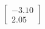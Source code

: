 \documentclass[preview]{standalone}
\begin{document}
\begin{align*}
\begin{bmatrix} -3.10 \\ 2.05 \end{bmatrix}
\end{align*}
\end{document}
